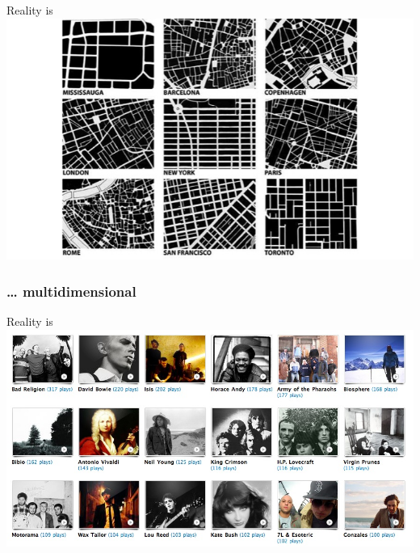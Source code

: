 \documentclass{beamer}
\begin{document}
	\begin{frame}[t]{Reality is }
		\href{http://www.bricoleurbanism.org/whimsicality/urban-fabric-form-comparison/}{\includegraphics[width=\textwidth]{images/visualize.jpg}}
	\end{frame}

	\subsubsection{… multidimensional}
	
	\begin{frame}[t]{Reality is }
		\href{http://www.last.fm/user/phnk1/library}{\includegraphics[width=\textwidth]{images/lastfm.jpg}}
	\end{frame}
\end{document}
